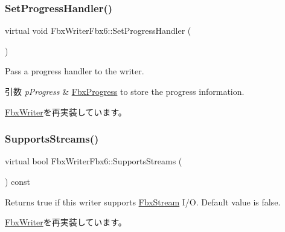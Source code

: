 \mbox{\label{class_fbx_writer_fbx6_a3877fb079da98f7883ec977a5fe206f1}} 
\subsubsection{\texorpdfstring{Set\+Progress\+Handler()}{SetProgressHandler()}}
{\footnotesize\ttfamily virtual void Fbx\+Writer\+Fbx6\+::\+Set\+Progress\+Handler (\begin{DoxyParamCaption}\item[{\hyperlink{class_fbx_progress}{Fbx\+Progress} $\ast$}]{ }\end{DoxyParamCaption})\hspace{0.3cm}{\ttfamily [virtual]}}

Pass a progress handler to the writer. 
\begin{DoxyParams}{引数}
{\em p\+Progress} & \hyperlink{class_fbx_progress}{Fbx\+Progress} to store the progress information. \\
\hline
\end{DoxyParams}


\hyperlink{class_fbx_writer_a1a3cf241a0c11364981ebd23be59fd8f}{Fbx\+Writer}を再実装しています。

\mbox{\label{class_fbx_writer_fbx6_a74bc2a2a859a59118567ac2d0a471ef7}} 
\subsubsection{\texorpdfstring{Supports\+Streams()}{SupportsStreams()}}
{\footnotesize\ttfamily virtual bool Fbx\+Writer\+Fbx6\+::\+Supports\+Streams (\begin{DoxyParamCaption}{ }\end{DoxyParamCaption}) const\hspace{0.3cm}{\ttfamily [virtual]}}

Returns true if this writer supports \hyperlink{class_fbx_stream}{Fbx\+Stream} I/O. Default value is false. 

\hyperlink{class_fbx_writer_aa79a285227d113ee6d64aee6a84986cd}{Fbx\+Writer}を再実装しています。

